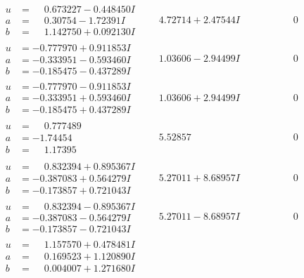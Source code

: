 \documentclass[1p]{elsarticle_modified}
\theoremstyle{definition}
\begin{document}
$$\begin{array}{c|c|c}
\begin{aligned}
u &= \phantom{-}0.673227 - 0.448450 I \\
a &= \phantom{-}0.30754 - 1.72391 I \\
b &= \phantom{-}1.142750 + 0.092130 I\end{aligned}
 & \phantom{-}4.72714 + 2.47544 I & \phantom{-0.000000 } 0 \\ \hline\begin{aligned}
u &= -0.777970 + 0.911853 I \\
a &= -0.333951 - 0.593460 I \\
b &= -0.185475 - 0.437289 I\end{aligned}
 & \phantom{-}1.03606 - 2.94499 I & \phantom{-0.000000 } 0 \\ \hline\begin{aligned}
u &= -0.777970 - 0.911853 I \\
a &= -0.333951 + 0.593460 I \\
b &= -0.185475 + 0.437289 I\end{aligned}
 & \phantom{-}1.03606 + 2.94499 I & \phantom{-0.000000 } 0 \\ \hline\begin{aligned}
u &= \phantom{-}0.777489\phantom{ +0.000000I} \\
a &= -1.74454\phantom{ +0.000000I} \\
b &= \phantom{-}1.17395\phantom{ +0.000000I}\end{aligned}
 & \phantom{-}5.52857\phantom{ +0.000000I} & \phantom{-0.000000 } 0 \\ \hline\begin{aligned}
u &= \phantom{-}0.832394 + 0.895367 I \\
a &= -0.387083 + 0.564279 I \\
b &= -0.173857 + 0.721043 I\end{aligned}
 & \phantom{-}5.27011 + 8.68957 I & \phantom{-0.000000 } 0 \\ \hline\begin{aligned}
u &= \phantom{-}0.832394 - 0.895367 I \\
a &= -0.387083 - 0.564279 I \\
b &= -0.173857 - 0.721043 I\end{aligned}
 & \phantom{-}5.27011 - 8.68957 I & \phantom{-0.000000 } 0 \\ \hline\begin{aligned}
u &= \phantom{-}1.157570 + 0.478481 I \\
a &= \phantom{-}0.169523 + 1.120890 I \\
b &= \phantom{-}0.004007 + 1.271680 I\end{aligned}

\end{array}$$
\end{document}
